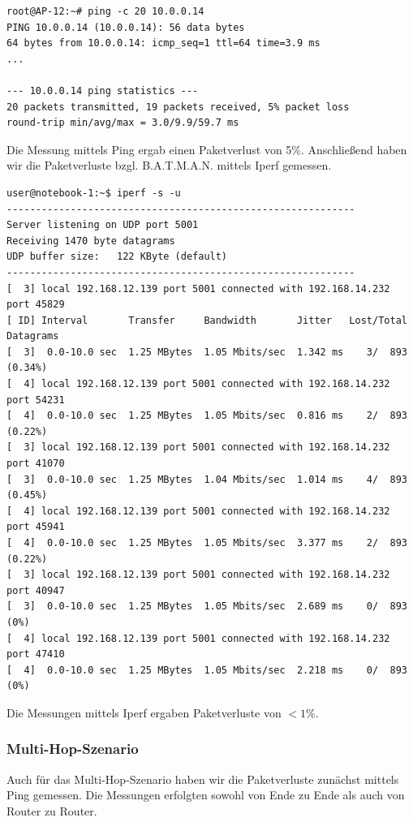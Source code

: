 \documentclass[a4paper,10pt]{article}
\begin{document}
\begin{lstlisting}
root@AP-12:~# ping -c 20 10.0.0.14
PING 10.0.0.14 (10.0.0.14): 56 data bytes
64 bytes from 10.0.0.14: icmp_seq=1 ttl=64 time=3.9 ms
...

--- 10.0.0.14 ping statistics ---
20 packets transmitted, 19 packets received, 5% packet loss
round-trip min/avg/max = 3.0/9.9/59.7 ms
\end{lstlisting}

Die Messung mittels Ping ergab einen Paketverlust von 5\%.
Anschließend haben wir die Paketverluste bzgl. B.A.T.M.A.N. mittels Iperf gemessen.

\begin{lstlisting}
user@notebook-1:~$ iperf -s -u
------------------------------------------------------------
Server listening on UDP port 5001
Receiving 1470 byte datagrams
UDP buffer size:   122 KByte (default)
------------------------------------------------------------
[  3] local 192.168.12.139 port 5001 connected with 192.168.14.232 port 45829
[ ID] Interval       Transfer     Bandwidth       Jitter   Lost/Total Datagrams
[  3]  0.0-10.0 sec  1.25 MBytes  1.05 Mbits/sec  1.342 ms    3/  893 (0.34%)
[  4] local 192.168.12.139 port 5001 connected with 192.168.14.232 port 54231
[  4]  0.0-10.0 sec  1.25 MBytes  1.05 Mbits/sec  0.816 ms    2/  893 (0.22%)
[  3] local 192.168.12.139 port 5001 connected with 192.168.14.232 port 41070
[  3]  0.0-10.0 sec  1.25 MBytes  1.04 Mbits/sec  1.014 ms    4/  893 (0.45%)
[  4] local 192.168.12.139 port 5001 connected with 192.168.14.232 port 45941
[  4]  0.0-10.0 sec  1.25 MBytes  1.05 Mbits/sec  3.377 ms    2/  893 (0.22%)
[  3] local 192.168.12.139 port 5001 connected with 192.168.14.232 port 40947
[  3]  0.0-10.0 sec  1.25 MBytes  1.05 Mbits/sec  2.689 ms    0/  893 (0%)
[  4] local 192.168.12.139 port 5001 connected with 192.168.14.232 port 47410
[  4]  0.0-10.0 sec  1.25 MBytes  1.05 Mbits/sec  2.218 ms    0/  893 (0%)
\end{lstlisting}

Die Messungen mittels Iperf ergaben Paketverluste von $< 1\%$.

\subsubsection*{Multi-Hop-Szenario}

Auch für das Multi-Hop-Szenario haben wir die Paketverluste zunächst mittels Ping gemessen.
Die Messungen erfolgten sowohl von Ende zu Ende als auch von Router zu Router.
\end{document}
